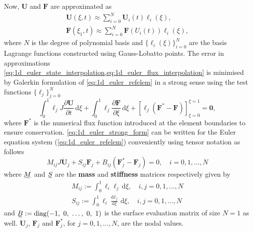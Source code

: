 \documentclass[a4paper,11pt,oneside]{article}
\newcommand{\newword}[1]{\textbf{#1}} %
\newcommand{\vect}[1]{\ensuremath{\boldsymbol{\mathbf{#1}}}} %
\newcommand{\pder}[2]{\frac{\partial #1}{\partial #2}} %
\newcommand{\der}[2]{\frac{\sdd #1}{\sdd #2}}
\newcommand{\sdi}{\ensuremath{\,\text{d}}} %
\newcommand{\sdd}{\ensuremath{\text{d}}} %
\DeclareMathOperator{\diag}{diag} %
\newcommand{\defeq}{\ensuremath{:=}} %
\newcommand{\linalgmat}[1]{\ensuremath{\undertilde{#1}}} %
\newcommand{\eulerref}[1]{\ensuremath{#1}} %
\begin{document}
Now, $\vect{\eulerref{U}}$ and $\vect{\eulerref{F}}$ are approximated as
\begin{gather}
	\vect{\eulerref{U}}(\xi,t) \approx \sum_{i=0}^{N} \vect{\eulerref{U}}_i(t) \ell_i(\xi),
	\label{eq:1d_euler_state_interpolation}\\
	\eulerref{\vect{F}}(\xi_1,t) \approx \sum_{i=0}^{N} \eulerref{\vect{F}}(U_i(t)) \ell_i(\xi),
	\label{eq:1d_euler_flux_interpolation}
\end{gather}
where $N$ is the degree of polynomial basis and $\{\ell_i(\xi)\}_{i=0}^{N}$ are the basis Lagrange functions constructed using Gauss-Lobatto points. The error in approximations \cref{eq:1d_euler_state_interpolation,eq:1d_euler_flux_interpolation} is minimised by Galerkin formulation of \cref{eq:1d_euler_refelem} in a strong sense using the test functions $\{\ell_j\}_{j=0}^{N}$
\begin{equation}
	\int_{0}^{1} \ell_j J \pder{\vect{\eulerref{U}}}{t} \sdi \xi + \int_{0}^{1} \ell_j \pder{\vect{\eulerref{F}}}{\xi} \sdi \xi + \left[\ell_j (\vect{\eulerref{F}}^*-\vect{\eulerref{F}}) \right]_{\xi=0}^{\xi=1} = \vect{0},
	\label{eq:1d_euler_strong_form}
\end{equation}
where $\vect{\eulerref{F}}^*$ is the numerical flux function introduced at the element boundaries to ensure conservation. \cref{eq:1d_euler_strong_form} can be written for the Euler equation system (\cref{eq:1d_euler_refelem}) conveniently using tensor notation as follows
\begin{equation}
	M_{ij} J \dot{\vect{\eulerref{U}}}_j + S_{ij} \vect{\eulerref{F}}_j + B_{ij} \left( \vect{\eulerref{F}}^*_j - \vect{\eulerref{F}}_j \right) = 0, \quad i=0,1,\ldots,N
	\label{eq:1d_euler_tensor_form1}
\end{equation}
where $\linalgmat{M}$ and $\linalgmat{S}$ are the \newword{mass} and \newword{stiffness} matrices respectively given by
\begin{gather*}
	M_{ij} \defeq \int_{0}^{1} \ell_i \ell_j \sdi \xi, \quad i,j=0,1,\ldots,N\\
	S_{ij} \defeq \int_{0}^{1} \ell_i \der{\ell_j}{\xi} \sdi \xi, \quad i,j=0,1,\ldots,N
\end{gather*}
and $\linalgmat{B} \defeq \diag (-1,\ 0,\ \ldots,\ 0,\ 1)$ is the surface evaluation matrix of size $N=1$ as well. $\dot{\vect{\eulerref{U}}}_j$, $\vect{\eulerref{F}}_j$ and $\vect{\eulerref{F}}^*_j$, for $j=0,1,\ldots,N$, are the nodal values.
\end{document}
